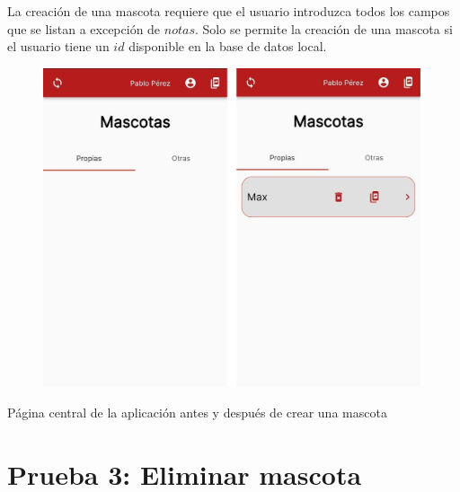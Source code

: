 La creación de una mascota requiere que el usuario introduzca todos los campos que se listan a excepción de $notas$. Solo se permite la creación de una mascota si el usuario tiene un $id$ disponible en la base de datos local.

\begin{figure}[h!]
\begin{center}
\includegraphics[scale=0.19]{Graphics/images/hcvet/home.jpg}
\label{fig:bac}

\end{center}
\end{figure}

Página central de la aplicación antes y después de crear una mascota

\newpage
\section{Prueba 3: Eliminar mascota}

